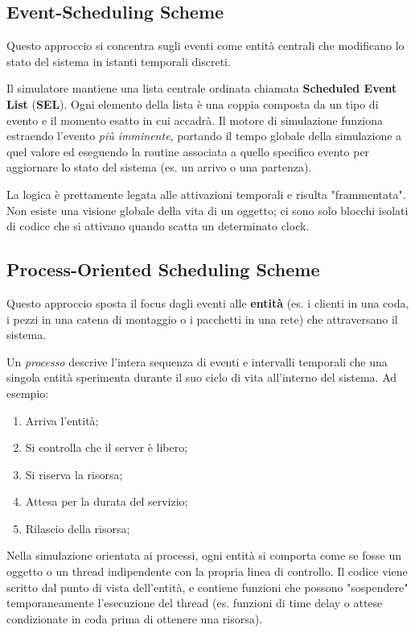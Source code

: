 \subsection{Event-Scheduling Scheme}
Questo approccio si concentra sugli eventi come entità centrali che modificano lo stato del sistema in istanti temporali discreti.

Il simulatore mantiene una lista centrale ordinata chiamata \textbf{Scheduled Event List} (\textbf{SEL}). Ogni elemento della lista è una coppia composta da un tipo di evento e il momento esatto in cui accadrà. Il motore di simulazione funziona estraendo l'evento \textit{più imminente}, portando il tempo globale della simulazione a quel valore ed eseguendo la routine associata a quello specifico evento per aggiornare lo stato del sistema (es. un arrivo o una partenza).

La logica è prettamente legata alle attivazioni temporali e risulta "frammentata". Non esiste una visione globale della vita di un oggetto; ci sono solo blocchi isolati di codice che si attivano quando scatta un determinato clock.

\subsection{Process-Oriented Scheduling Scheme}
Questo approccio sposta il focus dagli eventi alle \textbf{entità} (es. i clienti in una coda, i pezzi in una catena di montaggio o i pacchetti in una rete) che attraversano il sistema.

Un \textit{processo} descrive l'intera sequenza di eventi e intervalli temporali che una singola entità sperimenta durante il suo ciclo di vita all'interno del sistema. Ad esempio:
\begin{enumerate}
	\item Arriva l'entità;
	\item Si controlla che il server è libero;
	\item Si riserva la risorsa;
	\item Attesa per la durata del servizio;
	\item Rilascio della risorsa;
\end{enumerate}

Nella simulazione orientata ai processi, ogni entità si comporta come se fosse un oggetto o un thread indipendente con la propria linea di controllo. Il codice viene scritto dal punto di vista dell'entità, e contiene funzioni che possono "sospendere" temporaneamente l'esecuzione del thread (es. funzioni di time delay o attese condizionate in coda prima di ottenere una risorsa).

